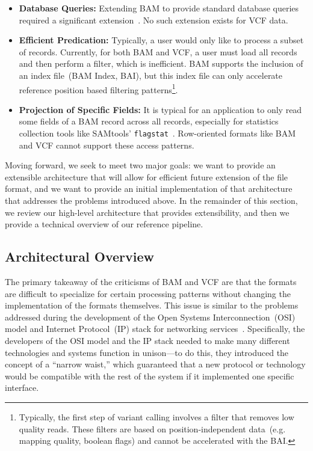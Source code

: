 \documentclass{bioinfo}
\begin{document}
\begin{itemize}
\item \textbf{Database Queries:} Extending BAM to provide standard database queries required a significant extension~\citep{kozanitis13}.
No such extension exists for VCF data.
\item \textbf{Efficient Predication:} Typically, a user would only like to process a subset of records. Currently, for both BAM and VCF, a user must load all
records and then perform a filter, which is inefficient. BAM supports the inclusion of an index file~(BAM Index, BAI), but this index file can only accelerate
reference position based filtering patterns\footnote{Typically, the first step of variant calling involves a filter that removes low quality reads. These filters
are based on position-independent data~(e.g. mapping quality, boolean flags) and cannot be accelerated with the BAI.}.
\item \textbf{Projection of Specific Fields:} It is typical for an application to only read some fields of a BAM record across all records, especially for
statistics collection tools like SAMtools' \texttt{flagstat}~\citep{li09}. Row-oriented formats like BAM and VCF cannot support these access patterns.
\end{itemize}

Moving forward, we seek to meet two major goals: we want to provide an extensible architecture that will allow for efficient future extension of the
file format, and we want to provide an initial implementation of that architecture that addresses the problems introduced above. In the remainder
of this section, we review our high-level architecture that provides extensibility, and then we provide a technical overview of our reference pipeline.

\subsection{Architectural Overview}
\label{sec:architectural-overview}

The primary takeaway of the criticisms of BAM and VCF are that the formats are difficult to specialize for certain processing patterns without
changing the implementation of the formats themselves. This issue is similar to the problems addressed during the development of the Open
Systems Interconnection~(OSI) model and Internet Protocol~(IP) stack for networking services~\citep{zimmermann80}. Specifically, the developers
of the OSI model and the IP stack needed to make many different technologies and systems function in unison---to do this, they introduced the
concept of a ``narrow waist,'' which guaranteed that a new protocol or technology would be compatible with the rest of the system if it implemented
one specific interface.
\end{document}
